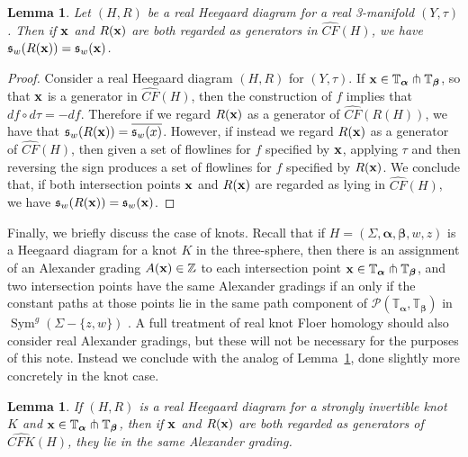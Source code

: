 \documentclass[11pt,reqno]{amsart}
\newtheorem{lem}[thm]{Lemma}
\theoremstyle{definition}
\theoremstyle{remark}
\newcommand{\T}{\mathbb{T}}
\DeclareMathOperator{\Sym}{{Sym}}
\newcommand{\alphas}{\boldsymbol \alpha}
\newcommand{\betas}{\boldsymbol \beta}
\newcommand{\CF}{\mathit{CF}}
\newcommand{\CFhat}{\widehat{\CF}}
\newcommand{\CFK}{\mathit{CFK}}
\newcommand\CFKhat{\widehat{\CFK}}
\numberwithin{equation}{section}
\begin{document}
\begin{lem} \label{lem:spincsame} Let $(H,R)$ be a real Heegaard diagram for a real 3-manifold $(Y,\tau)$. Then if ${\bf x}$ and $R({\bf x})$ are both regarded as generators in $\CFhat(H)$, we have $\mathfrak{s}_w(R({\bf x})) = \mathfrak{s}_w({\bf x})$. \end{lem}

\begin{proof} Consider a real Heegaard diagram $(H,R)$ for $(Y, \tau)$. If ${\bf x} \in \T_{\alphas} \pitchfork \T_{\betas}$, so that ${\bf x}$ is a generator in $\CFhat(H)$, then the construction of $f$ implies that $df \circ d\tau =-df$. Therefore if we regard $R({\bf x})$ as a generator of $\CFhat(R(H))$, we have that $\mathfrak s_{w}(R({\bf x})) = \overline{\mathfrak s_{w}(x)}$. However, if instead we regard $R({\bf x})$ as a generator of $\CFhat(H)$, then given a set of flowlines for $f$ specified by ${\bf x}$, applying $\tau$ and then reversing the sign produces a set of flowlines for $f$ specified by $R({\bf x})$. We conclude that, if both intersection points ${\bf x}$ and $R({\bf x})$ are regarded as lying in $\CFhat(H)$, we have $\mathfrak{s}_w(R({\bf x})) = \mathfrak{s}_w({\bf x})$. \end{proof}


Finally, we briefly discuss the case of knots. Recall that if $H = (\Sigma, \alphas, \betas, w,z)$ is a Heegaard diagram for a knot $K$ in the three-sphere, then there is an assignment of an Alexander grading $A({\bf x}) \in \mathbb Z$ to each intersection point ${\bf x} \in \T_{\alphas} \pitchfork \T_{\betas}$, and two intersection points have the same Alexander gradings if an only if the constant paths at those points lie in the same path component of $\mathcal P(\T_{\alphas}, \T_{\betas})$ in $\Sym^g(\Sigma - \{z,w\})$ \cite[Section 2]{OSKnots}. A full treatment of real knot Floer homology should also consider real Alexander gradings, but these will not be necessary for the purposes of this note. Instead we conclude with the analog of Lemma~\ref{lem:spincsame}, done slightly more concretely in the knot case.

\begin{lem} \label{lem:Alexandersame} If $(H,R)$ is a real Heegaard diagram for a strongly invertible knot $K$ and ${\bf x} \in \T_{\alphas} \pitchfork \T_{\betas}$, then if ${\bf x}$ and $R({\bf x})$ are both regarded as generators of $\CFKhat(H)$, they lie in the same Alexander grading. \end{lem}
\end{document}
